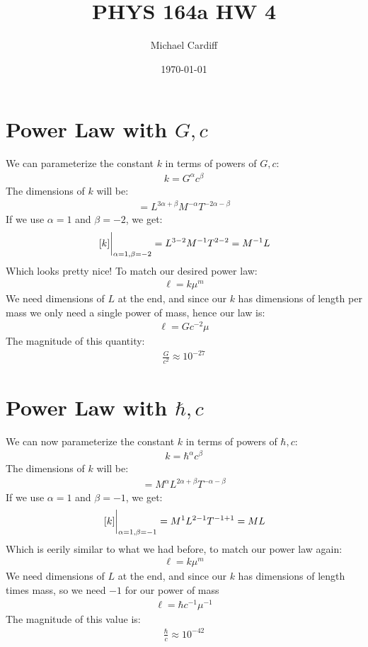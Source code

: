 \documentclass[12pt]{article}
\title{\vspace{-3em}PHYS 164a HW 4}
\author{Michael Cardiff}
\date{\today}
\begin{document}
\maketitle
\section{Power Law with $G,c$}
We can parameterize the constant $k$ in terms of powers of $G,c$:
\begin{align*}
  k=G^\alpha c^\beta
\end{align*}
The dimensions of $k$ will be:
\begin{align*}
  [k]=L^{3\alpha+\beta}M^{-\alpha}T^{-2\alpha-\beta}
\end{align*}
If we use $\alpha=1$ and $\beta=-2$, we get:
\begin{align*}
  \eval{[k]}_{\alpha=1,\beta=-2}=L^{3-2}M^{-1}T^{2-2}=M^{-1}L
\end{align*}
Which looks pretty nice! To match our desired power law:
\begin{align*}
  \ell=k\mu^m
\end{align*}
We need dimensions of $L$ at the end, and since our $k$ has dimensions of length per mass we only need a single power of mass, hence our law is:
\begin{align}
  \boxed{\ell=Gc^{-2}\mu}
\end{align}
The magnitude of this quantity:
\begin{align*}
  \frac{G}{c^2}\approx 10^{-27}
\end{align*}\newpage
\section{Power Law with $\hbar,c$}
We can now parameterize the constant $k$ in terms of powers of $\hbar,c$:
\begin{align*}
  k=\hbar^\alpha c^\beta
\end{align*}
The dimensions of $k$ will be:
\begin{align*}
  [k]=M^{\alpha} L^{2\alpha+\beta} T^{-\alpha-\beta}
\end{align*}
If we use $\alpha=1$ and $\beta=-1$, we get:
\begin{align*}
  \eval{[k]}_{\alpha=1,\beta=-1}=M^{1} L^{2-1} T^{-1+1}=ML
\end{align*}
Which is eerily similar to what we had before, to match our power law again:
\begin{align*}
  \ell=k\mu^m
\end{align*}
We need dimensions of $L$ at the end, and since our $k$ has dimensions of length times mass, so we need $-1$ for our power of mass
\begin{align}
  \boxed{\ell=\hbar c^{-1}\mu^{-1}}
\end{align}
The magnitude of this value is:
\begin{align*}
  \frac{\hbar}{c}\approx 10^{-42}
\end{align*}
\end{document}
